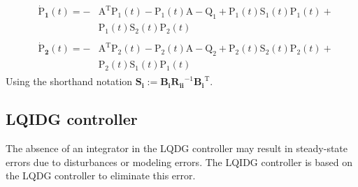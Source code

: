 \documentclass[conference]{IEEEtran}
\begin{document}
\begin{equation}\label{coupled_riccatti_LQDG}
	\begin{split}
		&\begin{split}
             \boldsymbol{\dot{\mathrm{P}}_1}(t) = -&\boldsymbol{\mathrm{A}}^\mathrm{T}\boldsymbol{\mathrm{P_1}}(t) - \boldsymbol{\mathrm{P_1}}(t)\boldsymbol{\mathrm{A}} - \boldsymbol{\mathrm{Q_1}} +\boldsymbol{\mathrm{P_1}}(t)\boldsymbol{\mathrm{S_1}}(t)\boldsymbol{\mathrm{P_1}}(t) +\\ &\boldsymbol{\mathrm{P_1}}(t)\boldsymbol{\mathrm{S_2}}(t)\boldsymbol{\mathrm{P_2}}(t)
		\end{split}\\
		&\begin{split}
            \boldsymbol{\dot{\mathrm{P}}_2}(t) = -&\boldsymbol{\mathrm{A}}^\mathrm{T}\boldsymbol{\mathrm{P_2}}(t) - \boldsymbol{\mathrm{P_2}}(t)\boldsymbol{\mathrm{A}} - \boldsymbol{\mathrm{Q_2}} +\boldsymbol{\mathrm{P_2}}(t)\boldsymbol{\mathrm{S_2}}(t)\boldsymbol{\mathrm{P_2}}(t) +\\ &\boldsymbol{\mathrm{P_2}}(t)\boldsymbol{\mathrm{S_1}}(t)\boldsymbol{\mathrm{P_1}}(t)
		\end{split}
	\end{split}
\end{equation}
Using the shorthand notation $\boldsymbol{S_i} := \boldsymbol{B_iR_{ii}}^{-1}\boldsymbol{B_i}^\mathrm{T}$. %


\subsection{LQIDG controller}
The absence of an integrator in the LQDG controller may result in steady-state errors due to disturbances or modeling errors.
The LQIDG controller is based on the LQDG controller to eliminate this error.
\end{document}
